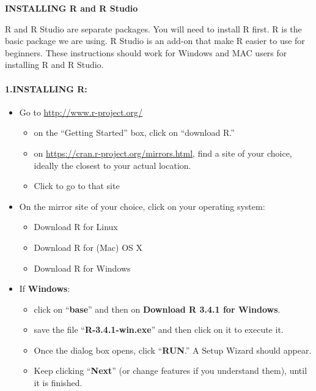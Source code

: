 \documentclass[]{article}
\providecommand{\tightlist}{%
  \setlength{\itemsep}{0pt}\setlength{\parskip}{0pt}}
\let\oldparagraph\paragraph
\renewcommand{\paragraph}[1]{\oldparagraph{#1}\mbox{}}
\begin{document}
\textbf{INSTALLING R and R Studio}

R and R Studio are separate packages. You will need to install R first.
R is the basic package we are using. R Studio is an add-on that make R
easier to use for beginners. These instructions should work for Windows
and MAC users for installing R and R Studio.

\paragraph{\texorpdfstring{\textbf{1.INSTALLING
R:}}{1.INSTALLING R:}}\label{installing-r}

\begin{itemize}
\item
  Go to \url{http://www.r-project.org/}

  \begin{itemize}
  \tightlist
  \item
    on the ``Getting Started'' box, click on ``download R.''
  \item
    on \url{https://cran.r-project.org/mirrors.html}, find a site of
    your choice, ideally the closest to your actual location.
  \item
    Click to go to that site
  \end{itemize}
\item
  On the mirror site of your choice, click on your operating system:

  \begin{itemize}
  \tightlist
  \item
    Download R for Linux
  \item
    Download R for (Mac) OS X
  \item
    Download R for Windows
  \end{itemize}
\item
  If \textbf{Windows}:

  \begin{itemize}
  \item
    click on ``\textbf{base}'' and then on \textbf{Download R 3.4.1 for
    Windows}.
  \item
    save the file ``\textbf{R-3.4.1-win.exe}'' and then click on it to
    execute it.
  \item
    Once the dialog box opens, click ``\textbf{RUN}.'' A Setup Wizard
    should appear.
  \item
    Keep clicking ``\textbf{Next}'' (or change features if you
    understand them), until it is finished.


\end{itemize}
\end{itemize}
\end{document}
